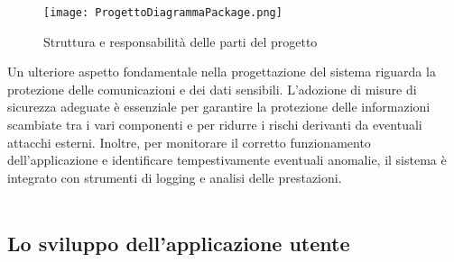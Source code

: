 \begin{figure}[htb]
    \centering
    \texttt{[image: ProgettoDiagrammaPackage.png]}
    \caption{Struttura e responsabilità delle parti del progetto}
\end{figure}

\clearpage

Un ulteriore aspetto fondamentale nella progettazione del sistema riguarda 
la protezione delle comunicazioni e dei dati sensibili.
L’adozione di misure di sicurezza adeguate è essenziale per garantire la protezione delle informazioni scambiate tra i vari componenti e
per ridurre i rischi derivanti da eventuali attacchi esterni.
Inoltre, per monitorare il corretto funzionamento dell’applicazione e identificare tempestivamente eventuali anomalie,
il sistema è integrato con strumenti di logging e analisi delle prestazioni.\\
\\




\clearpage
\subsection{Lo sviluppo dell'applicazione utente}

